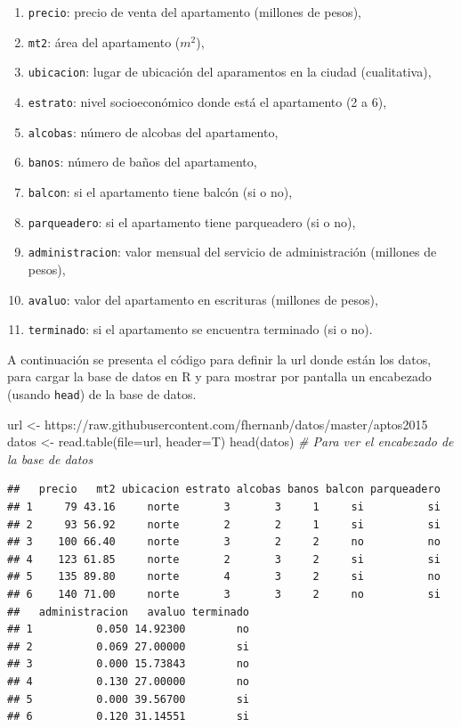 \documentclass[
]{book}
\makeatletter
\newenvironment{Shaded}{\begin{snugshade}}{\end{snugshade}}
\newcommand{\AttributeTok}[1]{\textcolor[rgb]{0.77,0.63,0.00}{#1}}
\newcommand{\CommentTok}[1]{\textcolor[rgb]{0.56,0.35,0.01}{\textit{#1}}}
\newcommand{\FunctionTok}[1]{\textcolor[rgb]{0.00,0.00,0.00}{#1}}
\newcommand{\NormalTok}[1]{#1}
\newcommand{\OtherTok}[1]{\textcolor[rgb]{0.56,0.35,0.01}{#1}}
\newcommand{\StringTok}[1]{\textcolor[rgb]{0.31,0.60,0.02}{#1}}
\providecommand{\tightlist}{%
  \setlength{\itemsep}{0pt}\setlength{\parskip}{0pt}}
\newenvironment{kframe}{%
\medskip{}
\setlength{\fboxsep}{.8em}
 \def\at@end@of@kframe{}%
 \ifinner\ifhmode%
  \def\at@end@of@kframe{\end{minipage}}%
  \begin{minipage}{\columnwidth}%
 \fi\fi%
 \def\FrameCommand##1{\hskip\@totalleftmargin \hskip-\fboxsep
 \colorbox{shadecolor}{##1}\hskip-\fboxsep
     \hskip-\linewidth \hskip-\@totalleftmargin \hskip\columnwidth}%
 \MakeFramed {\advance\hsize-\width
   \@totalleftmargin\z@ \linewidth\hsize
   \@setminipage}}%
 {\par\unskip\endMakeFramed%
 \at@end@of@kframe}
\renewenvironment{Shaded}{\begin{kframe}}{\end{kframe}}
\makeatother
\begin{document}
\begin{enumerate}
\def\labelenumi{\arabic{enumi}.}
\tightlist
\item
  \texttt{precio}: precio de venta del apartamento (millones de pesos),
\item
  \texttt{mt2}: área del apartamento (\(m^2\)),
\item
  \texttt{ubicacion}: lugar de ubicación del aparamentos en la ciudad (cualitativa),
\item
  \texttt{estrato}: nivel socioeconómico donde está el apartamento (2 a 6),
\item
  \texttt{alcobas}: número de alcobas del apartamento,
\item
  \texttt{banos}: número de baños del apartamento,
\item
  \texttt{balcon}: si el apartamento tiene balcón (si o no),
\item
  \texttt{parqueadero}: si el apartamento tiene parqueadero (si o no),
\item
  \texttt{administracion}: valor mensual del servicio de administración (millones de pesos),
\item
  \texttt{avaluo}: valor del apartamento en escrituras (millones de pesos),
\item
  \texttt{terminado}: si el apartamento se encuentra terminado (si o no).
\end{enumerate}

A continuación se presenta el código para definir la url donde están los datos, para cargar la base de datos en R y para mostrar por pantalla un encabezado (usando \texttt{head}) de la base de datos.

\begin{Shaded}
\begin{Highlighting}[]
\NormalTok{url }\OtherTok{\textless{}{-}} \StringTok{\textquotesingle{}https://raw.githubusercontent.com/fhernanb/datos/master/aptos2015\textquotesingle{}}
\NormalTok{datos }\OtherTok{\textless{}{-}} \FunctionTok{read.table}\NormalTok{(}\AttributeTok{file=}\NormalTok{url, }\AttributeTok{header=}\NormalTok{T)}
\FunctionTok{head}\NormalTok{(datos)  }\CommentTok{\# Para ver el encabezado de la base de datos}
\end{Highlighting}
\end{Shaded}

\begin{verbatim}
##   precio   mt2 ubicacion estrato alcobas banos balcon parqueadero
## 1     79 43.16     norte       3       3     1     si          si
## 2     93 56.92     norte       2       2     1     si          si
## 3    100 66.40     norte       3       2     2     no          no
## 4    123 61.85     norte       2       3     2     si          si
## 5    135 89.80     norte       4       3     2     si          no
## 6    140 71.00     norte       3       3     2     no          si
##   administracion   avaluo terminado
## 1          0.050 14.92300        no
## 2          0.069 27.00000        si
## 3          0.000 15.73843        no
## 4          0.130 27.00000        no
## 5          0.000 39.56700        si
## 6          0.120 31.14551        si
\end{verbatim}
\end{document}
